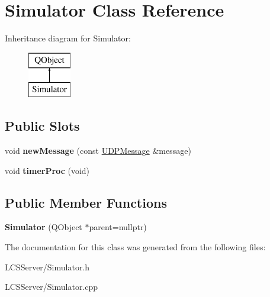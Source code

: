 \hypertarget{class_simulator}{}\section{Simulator Class Reference}
\label{class_simulator}
Inheritance diagram for Simulator\+:\begin{figure}[H]
\begin{center}
\leavevmode
\includegraphics[height=2.000000cm]{class_simulator}
\end{center}
\end{figure}
\subsection*{Public Slots}
\begin{DoxyCompactItemize}
\item 
\mbox{\label{class_simulator_a78a01e50374bc7f7c48d5c0844c0c553}} 
void {\bfseries new\+Message} (const \hyperlink{class_u_d_p_message}{U\+D\+P\+Message} \&message)
\item 
\mbox{\label{class_simulator_a17d6e27215aa41041477d849a2056e40}} 
void {\bfseries timer\+Proc} (void)
\end{DoxyCompactItemize}
\subsection*{Public Member Functions}
\begin{DoxyCompactItemize}
\item 
\mbox{\label{class_simulator_aa10d08136ea5bde785d46d8eb62fb4cf}} 
{\bfseries Simulator} (Q\+Object $\ast$parent=nullptr)
\end{DoxyCompactItemize}


The documentation for this class was generated from the following files\+:\begin{DoxyCompactItemize}
\item 
L\+C\+S\+Server/Simulator.\+h\item 
L\+C\+S\+Server/Simulator.\+cpp\end{DoxyCompactItemize}
